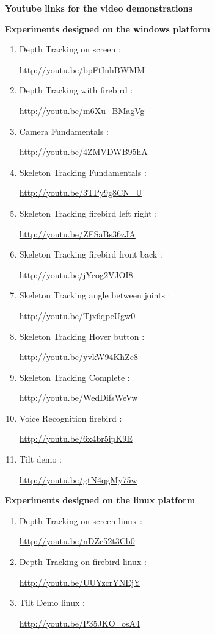 \documentclass[20pt]{report}
\begin{document}
\LARGE{\textbf{Youtube links for the video demonstrations}}

\medskip

\textbf{Experiments designed on the windows platform}
\medskip

\begin{enumerate}
\item Depth Tracking on screen :

\url{http://youtu.be/bpFtInhBWMM}

\item Depth Tracking with firebird :

\url{http://youtu.be/m6Xu\_BMagVg}

\item Camera Fundamentals :

\url{http://youtu.be/4ZMVDWB95hA}

\item Skeleton Tracking Fundamentals :

\url{http://youtu.be/3TPy9g8CN\_U}

\item Skeleton Tracking firebird left right :

\url{http://youtu.be/ZFSaBs36zJA}

\item Skeleton Tracking firebird front back :

\url{http://youtu.be/jYcog2VJOI8}

\item Skeleton Tracking angle between joints :

\url{http://youtu.be/Tjx6qpeUgw0}

\item Skeleton Tracking Hover button :

\url{http://youtu.be/yvkW94KhZe8}

\item Skeleton Tracking Complete :

\url{http://youtu.be/WedDifsWeVw}

\item Voice Recognition firebird :

\url {http://youtu.be/6x4br5ipK9E}

\item Tilt demo :

\url{http://youtu.be/gtN4qgMy75w}

\end{enumerate}

\newpage
\textbf{Experiments designed on the linux platform}

\medskip

\begin{enumerate}
\item Depth Tracking on screen linux :

\url{http://youtu.be/nDZc52t3Cb0}

\item Depth Tracking on firebird linux :

\url{http://youtu.be/UUYzcrYNEjY}

\item Tilt Demo linux :

\url{http://youtu.be/P35JKO\_osA4}
\end{enumerate}
\end{document}
